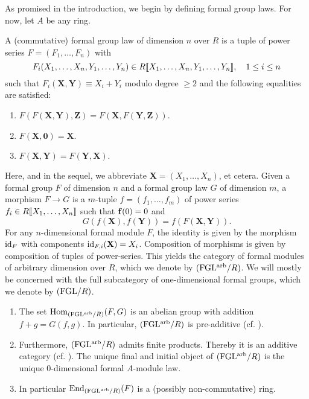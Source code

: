 As promised in the introduction, we begin by defining {formal group
laws}.
For now, let $A$ be any ring.
\begin{defi}
  A (commutative) formal group law  of dimension
  $n$ over $R$ is a tuple of
  power series $F = (F_1, \dots, F_n)$ with $$F_i(X_1, \dots, X_n,Y_1,
  \dots, Y_n) \in R\llbracket X_1, \dots,
  X_n, Y_1, \dots, Y_n\rrbracket, \quad 1 \leq i \leq n$$
  such that $F_i(\mathbf X, \mathbf Y) \equiv X_i + Y_i $ modulo degree $\geq 2$
  and the following equalities are satisfied:
  \begin{enumerate}
    \item $F(F (\mathbf X, \mathbf Y), \mathbf Z) = 
      F(\mathbf X, F(\mathbf Y, \mathbf Z))$.
    \item $F( \mathbf X, \mathbf 0) = \mathbf X$.
    \item $F( \mathbf X, \mathbf Y) = F(\mathbf Y, \mathbf X).$
  \end{enumerate}
  Here, and in the sequel, we abbreviate $\mathbf X =
  (X_1, \dots, X_n)$, et cetera.
  Given a formal group $F$ of dimension $n$ and a formal group law
  $G$ of dimension $m$,
  a morphism $F \to G$ is a $m$-tuple $f = (f_1, \dots, f_m)$ 
  of power series $f_i \in R\llbracket X_1, \dots, X_n \rrbracket$ such that $\mathbf{f}(0)=0$ and
  \begin{equation*}
    G(f( \mathbf X), f( \mathbf Y) ) = f(F( \mathbf X, \mathbf Y)).
  \end{equation*}
  For any $n$-dimensional formal module $F$, the identity is given by 
  the morphism $\operatorname{id}_{F}$ with components $\operatorname{id}_{F,i}( \mathbf X) = X_i$. 
  Composition of morphisms is given by composition of tuples of power-series.
  This yields the category of formal modules of arbitrary dimension over $R$,
  which we denote by ${(\mathrm{FGL^{arb}}/{R})}$. We will mostly be concerned with the full
  subcategory of one-dimensional formal groups, which we denote by ${(\mathrm{FGL}/{R})}$. 
\end{defi}

\begin{lem}\label{lem:FGLAdditive}
  \begin{enumerate}
    \item The set $\operatorname{Hom}_{{(\mathrm{FGL^{arb}}/{R})}} (F,G)$
      is an abelian group with addition $f+g = G(f,g)$. 
      In particular, ${(\mathrm{FGL^{arb}}/{R})}$ is pre-additive (cf.
      \cite[\href{https://stacks.math.columbia.edu/tag/00ZY}{Tag
      00ZY}]{stacks-project}).     
    \item Furthermore, ${(\mathrm{FGL^{arb}}/{R})}$ admits finite products. Thereby it is 
      an additive category (cf. \cite[\href{https://stacks.math.columbia.edu/tag/0104}{Tag
      0104}]{stacks-project}).
      The unique final and initial object of ${(\mathrm{FGL^{arb}}/{R})}$ is the unique
      $0$-dimensional formal $A$-module law.
    \item In particular $\operatorname{End}_{{(\mathrm{FGL^{arb}}/{R})}}(F)$ is a (possibly non-commutative)
      ring.
  \end{enumerate}
\end{lem}

